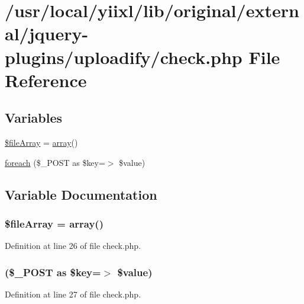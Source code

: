 \hypertarget{check_8php}{
\section{/usr/local/yiixl/lib/original/external/jquery-\/plugins/uploadify/check.php File Reference}
\label{check_8php}
}
\subsection*{Variables}
\begin{DoxyCompactItemize}
\item 
\hyperlink{check_8php_a82cb4ba974532399ae44234d4fcfb51a}{\$fileArray} = \hyperlink{list_8php_aa3205d038c7f8feb5c9f01ac4dfadc88}{array}()
\item 
\hyperlink{check_8php_ac6aafbc4d90cd74f481282f505f6c628}{foreach} (\$\_\-POST as \$key=$>$ \$value)
\end{DoxyCompactItemize}


\subsection{Variable Documentation}
\hypertarget{check_8php_a82cb4ba974532399ae44234d4fcfb51a}{
\subsubsection[{\$fileArray}]{\setlength{\rightskip}{0pt plus 5cm}\$fileArray = {\bf array}()}}
\label{check_8php_a82cb4ba974532399ae44234d4fcfb51a}


Definition at line 26 of file check.php.

\hypertarget{check_8php_ac6aafbc4d90cd74f481282f505f6c628}{
\subsubsection[{foreach}]{(\$\_\-POST as \$key=$>$ \$value)}}
\label{check_8php_ac6aafbc4d90cd74f481282f505f6c628}


Definition at line 27 of file check.php.

